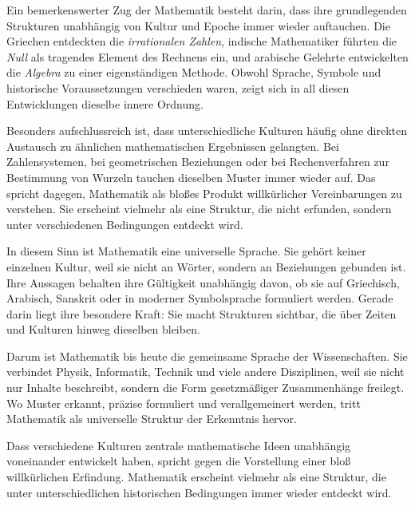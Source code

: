 Ein bemerkenswerter Zug der Mathematik besteht darin,
dass ihre grundlegenden Strukturen unabhängig von Kultur und Epoche immer wieder auftauchen.
Die Griechen entdeckten die \emph{irrationalen Zahlen},
indische Mathematiker führten die \emph{Null} als tragendes Element des Rechnens ein,
und arabische Gelehrte entwickelten die \emph{Algebra} zu einer eigenständigen Methode.
Obwohl Sprache, Symbole und historische Voraussetzungen verschieden waren,
zeigt sich in all diesen Entwicklungen dieselbe innere Ordnung.

Besonders aufschlussreich ist,
dass unterschiedliche Kulturen häufig ohne direkten Austausch zu ähnlichen mathematischen Ergebnissen gelangten.
Bei Zahlensystemen,
bei geometrischen Beziehungen
oder bei Rechenverfahren zur Bestimmung von Wurzeln
tauchen dieselben Muster immer wieder auf.
Das spricht dagegen,
Mathematik als bloßes Produkt willkürlicher Vereinbarungen zu verstehen.
Sie erscheint vielmehr als eine Struktur,
die nicht erfunden,
sondern unter verschiedenen Bedingungen entdeckt wird.

In diesem Sinn ist Mathematik eine universelle Sprache.
Sie gehört keiner einzelnen Kultur,
weil sie nicht an Wörter,
sondern an Beziehungen gebunden ist.
Ihre Aussagen behalten ihre Gültigkeit unabhängig davon,
ob sie auf Griechisch, Arabisch, Sanskrit oder in moderner Symbolsprache formuliert werden.
Gerade darin liegt ihre besondere Kraft:
Sie macht Strukturen sichtbar,
die über Zeiten und Kulturen hinweg dieselben bleiben.

Darum ist Mathematik bis heute die gemeinsame Sprache der Wissenschaften.
Sie verbindet Physik, Informatik, Technik und viele andere Disziplinen,
weil sie nicht nur Inhalte beschreibt,
sondern die Form gesetzmäßiger Zusammenhänge freilegt.
Wo Muster erkannt,
präzise formuliert
und verallgemeinert werden,
tritt Mathematik als universelle Struktur der Erkenntnis hervor.

\begin{NoteBox}
	\label{box:entdeckung}
	\small
	Dass verschiedene Kulturen zentrale mathematische Ideen unabhängig voneinander entwickelt haben,
	spricht gegen die Vorstellung einer bloß willkürlichen Erfindung.
	Mathematik erscheint vielmehr als eine Struktur,
	die unter unterschiedlichen historischen Bedingungen immer wieder entdeckt wird.
\end{NoteBox}

